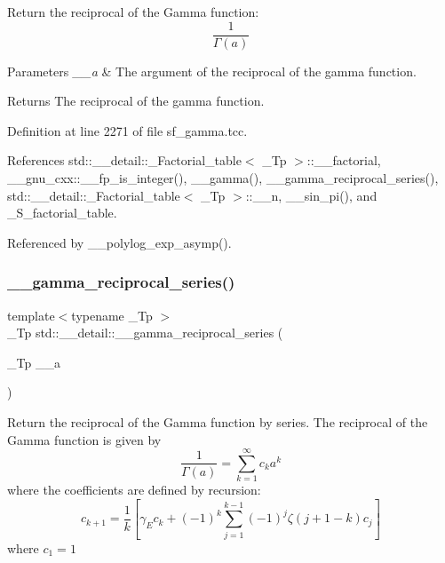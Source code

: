 Return the reciprocal of the Gamma function\+: \[ \frac{1}{\Gamma(a)} \]


\begin{DoxyParams}{Parameters}
{\em \+\_\+\+\_\+a} & The argument of the reciprocal of the gamma function. \\
\hline
\end{DoxyParams}
\begin{DoxyReturn}{Returns}
The reciprocal of the gamma function. 
\end{DoxyReturn}


Definition at line 2271 of file sf\+\_\+gamma.\+tcc.



References std\+::\+\_\+\+\_\+detail\+::\+\_\+\+Factorial\+\_\+table$<$ \+\_\+\+Tp $>$\+::\+\_\+\+\_\+factorial, \+\_\+\+\_\+gnu\+\_\+cxx\+::\+\_\+\+\_\+fp\+\_\+is\+\_\+integer(), \+\_\+\+\_\+gamma(), \+\_\+\+\_\+gamma\+\_\+reciprocal\+\_\+series(), std\+::\+\_\+\+\_\+detail\+::\+\_\+\+Factorial\+\_\+table$<$ \+\_\+\+Tp $>$\+::\+\_\+\+\_\+n, \+\_\+\+\_\+sin\+\_\+pi(), and \+\_\+\+S\+\_\+factorial\+\_\+table.



Referenced by \+\_\+\+\_\+polylog\+\_\+exp\+\_\+asymp().

\mbox{\label{namespacestd_1_1____detail_a08dc6d850e2f02ff45deaa4772298cf3}} 
\subsubsection{\texorpdfstring{\+\_\+\+\_\+gamma\+\_\+reciprocal\+\_\+series()}{\_\_gamma\_reciprocal\_series()}}
{\footnotesize\ttfamily template$<$typename \+\_\+\+Tp $>$ \\
\+\_\+\+Tp std\+::\+\_\+\+\_\+detail\+::\+\_\+\+\_\+gamma\+\_\+reciprocal\+\_\+series (\begin{DoxyParamCaption}\item[{\+\_\+\+Tp}]{\+\_\+\+\_\+a }\end{DoxyParamCaption})}

Return the reciprocal of the Gamma function by series. The reciprocal of the Gamma function is given by \[ \frac{1}{\Gamma(a)} = \sum_{k=1}^{\infty} c_k a^k \] where the coefficients are defined by recursion\+: \[ c_{k+1} = \frac{1}{k}\left[\gamma_E c_k + (-1)^k\sum_{j=1}^{k-1}(-1)^j\zeta(j+1-k)c_j\right] \] where $ c_1 = 1 $


